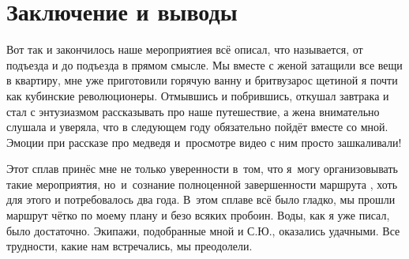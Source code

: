 \chapter{Заключение и выводы} 
\vepsianrose

Вот так и закончилось наше мероприятие\mdash я всё описал, что называется, от подъезда и до подъезда в прямом смысле. Мы вместе с женой затащили все вещи в квартиру, мне уже приготовили горячую ванну и бритву\mdash зарос щетиной я почти как кубинские революционеры. Отмывшись и побрившись, откушал завтрака и стал с энтузиазмом рассказывать про наше путешествие, а жена внимательно слушала и уверяла, что в следующем году обязательно пойдёт вместе со мной. Эмоции при рассказе про медведя и~просмотре видео с ним просто зашкаливали!

Этот сплав принёс мне не только уверенности в~том, что я~могу организовывать такие мероприятия, но~и~сознание полноценной завершенности маршрута , хоть для этого и потребовалось два года. В~этом сплаве всё было гладко, мы прошли маршрут чётко по моему плану и безо всяких пробоин. Воды, как я уже писал, было достаточно. Экипажи, подобранные мной и С.Ю., оказались удачными. Все трудности, какие нам встречались, мы преодолели.


